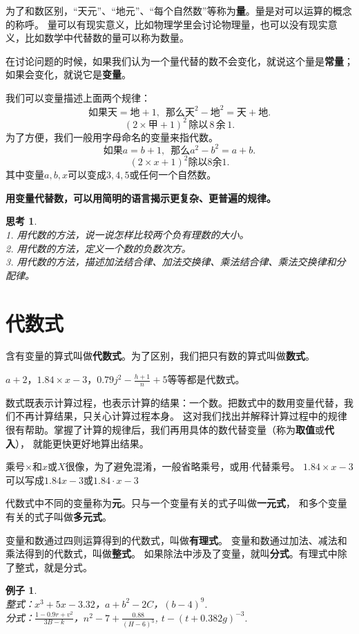\documentclass[12pt,UTF8]{ctexbook}
\newtheorem{ex}{例子}[section]
\newtheorem{sk}{思考}[section]
\begin{document}
为了和数区别，“天元”、“地元”、“每个自然数”等称为\textbf{量}。量是对可以运算的概念的称呼。
量可以有现实意义，比如物理学里会讨论物理量，也可以没有现实意义，比如数学中代替数的量可以称为数量。

在讨论问题的时候，如果我们认为一个量代替的数不会变化，就说这个量是\textbf{常量}；如果会变化，就说它是\textbf{变量}。

我们可以变量描述上面两个规律：
$$ \mbox{如果天} = \mbox{地}+1, \,\,\,\mbox{那么}\mbox{天}^2 - \mbox{地}^2 = \mbox{天} + \mbox{地}. $$
$$  (2\times \mbox{甲} + 1)^2 \,\mbox{除以} \,8\,\mbox{余}\,1.$$
为了方便，我们一般用字母命名的变量来指代数。
$$ \mbox{如果} a = b+1, \,\,\,\mbox{那么} a^2 - b^2 = a + b. $$
$$  (2\times x + 1)^2 \mbox{除以} 8\mbox{余} 1.$$
其中变量$a,b,x$可以变成$3,4,5$或任何一个自然数。

\textbf{用变量代替数，可以用简明的语言揭示更复杂、更普遍的规律。}

\begin{sk}\label{sk:1-0-0}
    \mbox{}\\
    1. 用代数的方法，说一说怎样比较两个负有理数的大小。\\
    2. 用代数的方法，定义一个数的负数次方。\\
    3. 用代数的方法，描述加法结合律、加法交换律、乘法结合律、乘法交换律和分配律。
\end{sk}

\section{代数式}
含有变量的算式叫做\textbf{代数式}。为了区别，我们把只有数的算式叫做\textbf{数式}。

$a + 2$，$1.84\times x - 3$，$0.79 j^2 - \frac{h+1}{n} + 5 $等等都是代数式。

数式既表示计算过程，也表示计算的结果：一个数。把数式中的数用变量代替，我们不再计算结果，只关心计算过程本身。
这对我们找出并解释计算过程中的规律很有帮助。掌握了计算的规律后，我们再用具体的数代替变量（称为\textbf{取值}或\textbf{代入}），
就能更快更好地算出结果。

乘号$\times$和$x$或$X$很像，为了避免混淆，一般省略乘号，或用$\cdot$代替乘号。
$1.84\times x - 3$可以写成$1.84 x - 3$或$1.84\cdot x - 3$

代数式中不同的变量称为\textbf{元}。只与一个变量有关的式子叫做\textbf{一元式}，
和多个变量有关的式子叫做\textbf{多元式}。

变量和数通过四则运算得到的代数式，叫做\textbf{有理式}。
变量和数通过加法、减法和乘法得到的代数式，叫做\textbf{整式}。
如果除法中涉及了变量，就叫\textbf{分式}。有理式中除了整式，就是分式。
\begin{ex}\label{ex:1-1-0}
    \mbox{} \\
    \indent 整式：$x^3 + 5x - 3.32$，$a + b^2 - 2C$，$(b - 4)^9.$ \\
    \indent 分式：$\frac{1 - 0.9r + v^2}{3B - k}$，$n^2 - 7 + \frac{0.88}{(H - 6)^3}$, $t - (t + 0.382g)^{-3}.$\\
\end{ex}
\end{document}
